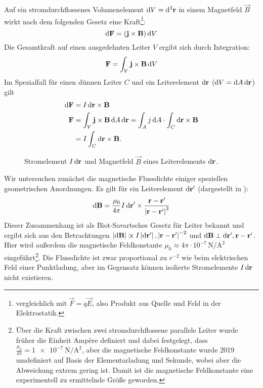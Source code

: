 Auf ein stromdurchflossenes Volumenelement $\mathop{}\!\mathrm{d} V=\mathop{}\!\mathrm{d}^3 \mathbf{r}$ in einem Magnetfeld $\vec B$ wirkt nach dem folgenden Gesetz eine Kraft\footnote{vergleichlich mit $\vec {F}=q\vec {E}$, also Produkt aus Quelle und Feld in der Elektrostatik. }:
\begin{equation*}
	\mathop{}\!\mathrm{d} \mathbf{F}=(\mathbf{j}\times\mathbf{B})\mathop{}\!\mathrm{d} V
\end{equation*}
Die Gesamtkraft auf einen ausgedehnten Leiter $V$ ergibt sich durch Integration:
\begin{equation*}
	\mathbf{F}=\int _{V}\mathbf{j}\times \mathbf{B}\mathop{}\!\mathrm{d} V
\end{equation*}
Im Spezialfall für einen dünnen Leiter $C$ und ein Leiterelement $\mathop{}\!\mathrm{d}\mathbf{r}$ ($\mathop{}\!\mathrm{d} V = \mathop{}\!\mathrm{d} A\mathop{}\!\mathrm{d}\mathbf{r}$) gilt
\begin{align}
	\label{eq:def_magn_flussdichte}
	\mathop{}\!\mathrm{d} \mathbf{F} & =I\mathop{}\!\mathrm{d}\mathbf{r}\times\mathbf{B}                                                                                               \\
	\mathbf{F}     & =\int _{V}\mathbf{j}\times \mathbf{B}\mathop{}\!\mathrm{d} A \mathop{}\!\mathrm{d}\mathbf{r} = \int_{A}j\mathop{}\!\mathrm{d} A \cdot \int_C \mathop{}\!\mathrm{d}\mathbf{r}\times \mathbf{B} \nonumber \\& = I\int_C \mathop{}\!\mathrm{d}\mathbf{r}\times \mathbf{B} .\nonumber
\end{align}

\begin{figure}[htb]
	\centering
	\tfigMagnetfeldBeiLeiter
	\caption{Stromelement $I\mathop{}\!\mathrm{d}\mathbf{r}$ und Magnetfeld $\vec B$ eines Leiterelements $\mathop{}\!\mathrm{d} \mathbf{r}$. }
	\label{fig:magnetic_field_conductor_diff_view}
\end{figure}
Wir untersuchen zunächst die magnetische Flussdichte einiger speziellen geometrischen Anordnungen. Es gilt für ein Leiterelement $\mathop{}\!\mathrm{d} \mathbf{r}'$ (dargestellt in ):
\begin{equation*}
	\mathop{}\!\mathrm{d} \mathbf{B}=\frac{\mu _{0}}{4\pi }I\mathop{}\!\mathrm{d} \mathbf{r}'\times \frac{\mathbf{r}-\mathbf{r}'}{\left| \mathbf{r}-\mathbf{r}'\right| ^{3}}
\end{equation*}
Dieser Zusammenhang ist als Biot-Savartsches Gesetz für Leiter bekannt und ergibt sich aus den Betrachtungen $\left| \mathop{}\!\mathrm{d} \mathbf{B}\right| \propto I\left| \mathop{}\!\mathrm{d} \mathbf{r}'\right| , \left| \mathbf{r}-\mathbf{r}'\right| ^{-2}$ und $\mathop{}\!\mathrm{d} \mathbf{B}\perp \mathop{}\!\mathrm{d} \mathbf{r}',\mathbf{r}-\mathbf{r}'$. Hier wird außerdem die magnetische Feldkonstante $\mu _{0}\approx 4\pi \cdot 10^{-7}\,\si{\newton\per\square\ampere}$ eingeführt\footnote{Über die Kraft zwischen zwei stromdurchflossene parallele Leiter wurde früher die Einheit Ampère definiert und dabei festgelegt, dass $\frac{\mu _{0}}{4\pi }=\SI{1e-7}{\newton\per\square\ampere}$, aber die magnetische Feldkonstante wurde 2019 umdefiniert auf Basis der Elementarladung und Sekunde, wobei aber die Abweichung extrem gering ist. Damit ist die magnetische Feldkonstante eine experimentell zu ermittelnde Größe geworden. }. Die Flussdichte ist zwar proportional zu $r^{-2}$ wie beim elektrischen Feld einer Punktladung, aber im Gegensatz können isolierte Stromelemente $I\mathop{}\!\mathrm{d} \mathbf{r}$ nicht existieren.

